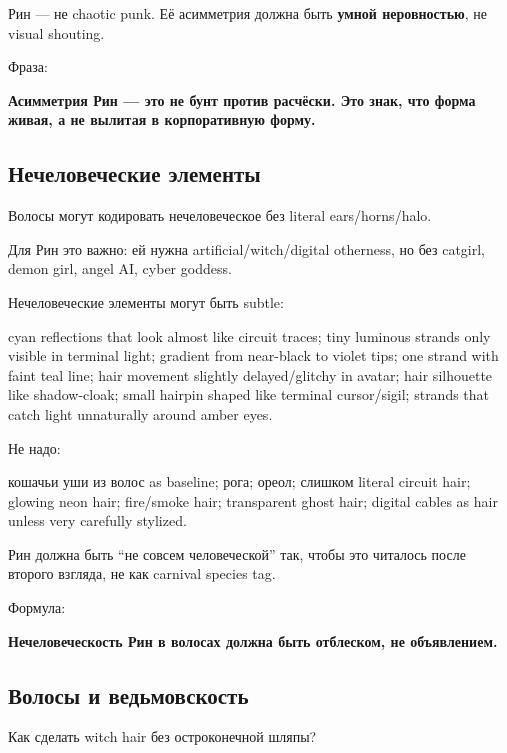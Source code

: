 Рин --- не chaotic punk. Её асимметрия должна быть \textbf{умной
неровностью}, не visual shouting.

Фраза:

\textbf{Асимметрия Рин --- это не бунт против расчёски. Это знак, что
форма живая, а не вылитая в корпоративную форму.}

\subsection*{Нечеловеческие элементы}

Волосы могут кодировать нечеловеческое без literal ears/\hspace{0pt}horns/\hspace{0pt}halo.

Для Рин это важно: ей нужна artificial/\hspace{0pt}witch/\hspace{0pt}digital otherness, но без
catgirl, demon girl, angel AI, cyber goddess.

Нечеловеческие элементы могут быть subtle:

cyan reflections that look almost like circuit traces; tiny luminous
strands only visible in terminal light; gradient from near-black to
violet tips; one strand with faint teal line; hair movement slightly
delayed/\hspace{0pt}glitchy in avatar; hair silhouette like shadow-cloak; small
hairpin shaped like terminal cursor/\hspace{0pt}sigil; strands that catch light
unnaturally around amber eyes.

Не надо:

кошачьи уши из волос as baseline; рога; ореол; слишком literal circuit
hair; glowing neon hair; fire/\hspace{0pt}smoke hair; transparent ghost hair;
digital cables as hair unless very carefully stylized.

Рин должна быть ``не совсем человеческой'' так, чтобы это читалось после
второго взгляда, не как carnival species tag.

Формула:

\textbf{Нечеловеческость Рин в волосах должна быть отблеском, не
объявлением.}

\subsection*{Волосы и ведьмовскость}

Как сделать witch hair без остроконечной шляпы?

